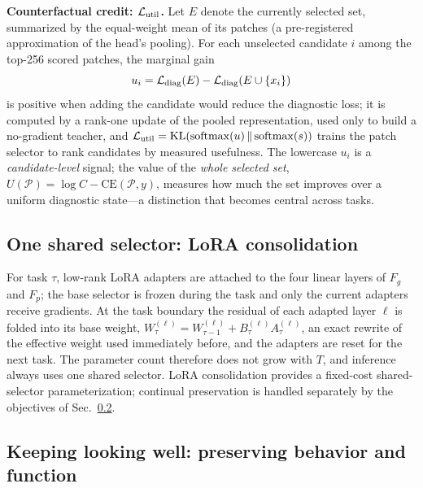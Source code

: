 \documentclass{article}
\def\L{{\cal L}}
\newcommand{\Fg}{F_g}
\newcommand{\Fp}{F_p}
\newcommand{\Psel}{\mathcal{P}}
\begin{document}
\textbf{Counterfactual credit: $\L_{\mathrm{util}}$.}
Let $E$ denote the currently selected set, summarized by the equal-weight mean of its patches (a pre-registered approximation of the head's pooling). For each unselected candidate $i$ among the top-256 scored patches, the marginal gain
\begin{equation}
u_i
=
\L_{\mathrm{diag}}(E)
-
\L_{\mathrm{diag}}(E\cup\{x_i\})
\label{eq:ui}
\end{equation}
is positive when adding the candidate would reduce the diagnostic loss; it is computed by a rank-one update of the pooled representation, used only to build a no-gradient teacher, and $\L_{\mathrm{util}}=\mathrm{KL}(\mathrm{softmax}(u)\,\Vert\,\mathrm{softmax}(s))$ trains the patch selector to rank candidates by measured usefulness. The lowercase $u_i$ is a \emph{candidate-level} signal; the value of the \emph{whole selected set}, $U(\Psel)=\log C-\mathrm{CE}(\Psel,y)$, measures how much the set improves over a uniform diagnostic state---a distinction that becomes central across tasks.

\subsection{One shared selector: LoRA consolidation}
\label{ssec:lora}

For task $\tau$, low-rank LoRA adapters are attached to the four linear layers of $\Fg$ and $\Fp$; the base selector is frozen during the task and only the current adapters receive gradients. At the task boundary the residual of each adapted layer $\ell$ is folded into its base weight, $W^{(\ell)}_{\tau}=W^{(\ell)}_{\tau-1}+B^{(\ell)}_\tau A^{(\ell)}_\tau$, an exact rewrite of the effective weight used immediately before, and the adapters are reset for the next task. The parameter count therefore does not grow with $T$, and inference always uses one shared selector. LoRA consolidation provides a fixed-cost shared-selector parameterization; continual preservation is handled separately by the objectives of Sec.~\ref{ssec:cl}.

\subsection{Keeping looking well: preserving behavior and function}
\label{ssec:cl}
\end{document}
